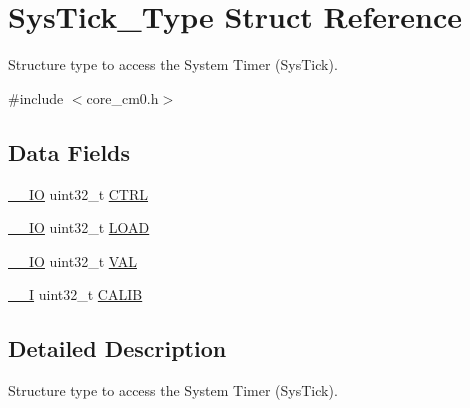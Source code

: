 \hypertarget{struct_sys_tick___type}{\section{Sys\-Tick\-\_\-\-Type Struct Reference}
\label{struct_sys_tick___type}
}


Structure type to access the System Timer (Sys\-Tick).  




{\ttfamily \#include $<$core\-\_\-cm0.\-h$>$}

\subsection*{Data Fields}
\begin{DoxyCompactItemize}
\item 
\hyperlink{group___c_m_s_i_s__core__definitions_gaec43007d9998a0a0e01faede4133d6be}{\-\_\-\-\_\-\-I\-O} uint32\-\_\-t \hyperlink{struct_sys_tick___type_a15fc8d35f045f329b80c544bef35ff64}{C\-T\-R\-L}
\item 
\hyperlink{group___c_m_s_i_s__core__definitions_gaec43007d9998a0a0e01faede4133d6be}{\-\_\-\-\_\-\-I\-O} uint32\-\_\-t \hyperlink{struct_sys_tick___type_aad9adf4efc940cddb8161b69cfbe19d3}{L\-O\-A\-D}
\item 
\hyperlink{group___c_m_s_i_s__core__definitions_gaec43007d9998a0a0e01faede4133d6be}{\-\_\-\-\_\-\-I\-O} uint32\-\_\-t \hyperlink{struct_sys_tick___type_a26fb318c3b0a0ec7f45daafd5f8799a3}{V\-A\-L}
\item 
\hyperlink{group___c_m_s_i_s__core__definitions_gaf63697ed9952cc71e1225efe205f6cd3}{\-\_\-\-\_\-\-I} uint32\-\_\-t \hyperlink{struct_sys_tick___type_a40e07d0a4638a676780713b6ceeec4ef}{C\-A\-L\-I\-B}
\end{DoxyCompactItemize}


\subsection{Detailed Description}
Structure type to access the System Timer (Sys\-Tick). 

